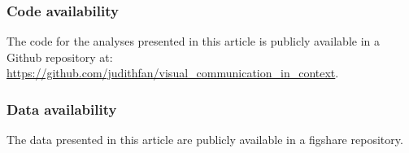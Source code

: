 \documentclass[9pt,twocolumn,twoside]{pnas-new}
\begin{document}
\subsubsection*{Code availability} The code for the analyses presented in this article is publicly available in a Github repository at: \url{https://github.com/judithfan/visual_communication_in_context}.

\subsubsection*{Data availability} The data presented in this article are publicly available in a figshare repository.


\end{document}
